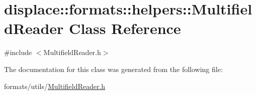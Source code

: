 \hypertarget{classdisplace_1_1formats_1_1helpers_1_1_multifield_reader}{}\section{displace\+::formats\+::helpers\+::Multifield\+Reader Class Reference}
\label{classdisplace_1_1formats_1_1helpers_1_1_multifield_reader}


{\ttfamily \#include $<$Multifield\+Reader.\+h$>$}



The documentation for this class was generated from the following file\+:\begin{DoxyCompactItemize}
\item 
formats/utils/\mbox{\hyperlink{_multifield_reader_8h}{Multifield\+Reader.\+h}}\end{DoxyCompactItemize}

